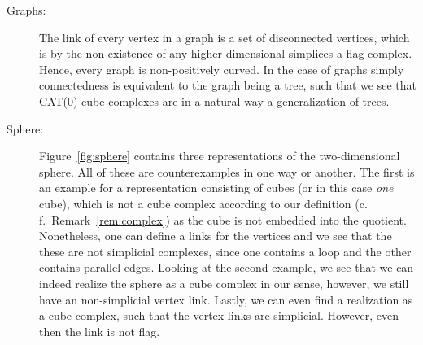 \begin{bsp}
  \label{bsp:ccc}
  \begin{description}
  \item[Graphs:] The link of every vertex in a graph is a set of disconnected vertices, which is by the non-existence of any higher dimensional simplices a flag complex. Hence, every graph is non-positively curved. In the case of graphs simply connectedness is equivalent to the graph being a tree, such that we see that CAT(0) cube complexes are in a natural way a generalization of trees.
  \item[Sphere:] Figure~\ref{fig:sphere} contains three representations of the two-dimensional sphere. All of these are counterexamples in one way or another. The first is an example for a representation consisting of cubes (or in this case \emph{one} cube), which is not a cube complex according to our definition (c.\,f.\ Remark~\ref{rem:complex}) as the cube is not embedded  into the quotient. Nonetheless, one can define a links for the vertices and we see that the these are not simplicial complexes, since one contains a loop and the other contains parallel edges. Looking at the second example, we see that we can indeed realize the sphere as a cube complex in our sense, however, we still have an non-simplicial vertex link. Lastly, we can even find a realization as a cube complex, such that the vertex links are simplicial. However, even then the link is not flag.


\end{description}
\end{bsp}
